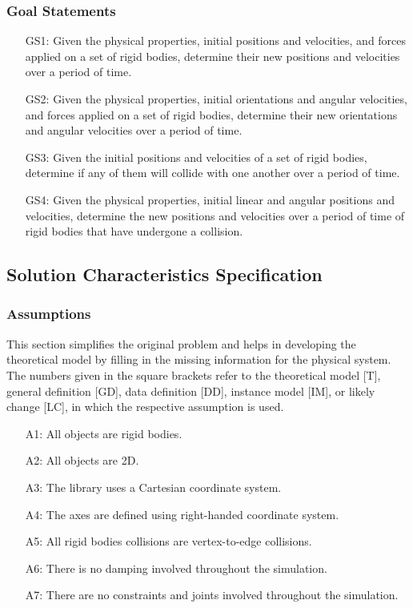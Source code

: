 \documentclass[12pt]{article}
\begin{document}
\subsubsection{Goal Statements}
\label{Sec:GS}
\begin{itemize}
\item[GS1:]Given the physical properties, initial positions and velocities, and forces applied on a set of rigid bodies, determine their new positions and velocities over a period of time.
\item[GS2:]Given the physical properties, initial orientations and angular velocities, and forces applied on a set of rigid bodies, determine their new orientations and angular velocities over a period of time.
\item[GS3:]Given the initial positions and velocities of a set of rigid bodies, determine if any of them will collide with one another over a period of time.
\item[GS4:]Given the physical properties, initial linear and angular positions and velocities, determine the new positions and velocities over a period of time of rigid bodies that have undergone a collision.
\end{itemize}
\subsection{Solution Characteristics Specification}
\label{Sec:SCS}
\subsubsection{Assumptions}
\label{Sec:A}
This section simplifies the original problem and helps in developing the theoretical model by filling in the missing information for the physical system. The numbers given in the square brackets refer to the theoretical model [T], general definition [GD], data definition [DD], instance model [IM], or likely change [LC], in which the respective assumption is used.
\begin{itemize}
\item[A1:]All objects are rigid bodies.
\item[A2:]All objects are 2D.
\item[A3:]The library uses a Cartesian coordinate system.
\item[A4:]The axes are defined using right-handed coordinate system.
\item[A5:]All rigid bodies collisions are vertex-to-edge collisions.
\item[A6:]There is no damping involved throughout the simulation.
\item[A7:]There are no constraints and joints involved throughout the simulation.
\end{itemize}
\end{document}
